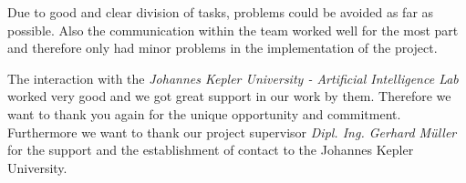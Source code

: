 Due to good and clear division of tasks, problems could be avoided as far as possible. Also the communication within the team worked well for the most part and therefore only had minor problems in the implementation of the project. \newline

The interaction with the \textit{Johannes Kepler University - Artificial Intelligence Lab} worked very good and we got great support in our work by them. Therefore we want to thank you again for the unique opportunity and commitment. Furthermore we want to thank our project supervisor \textit{Dipl. Ing. Gerhard Müller} for the support and the establishment of contact to the Johannes Kepler University.